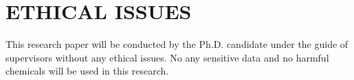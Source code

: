\section{ETHICAL ISSUES}

This research paper will be conducted by the Ph.D. candidate under the guide of supervisors without any ethical issues. No any sensitive data and no harmful chemicals will be used in this research.